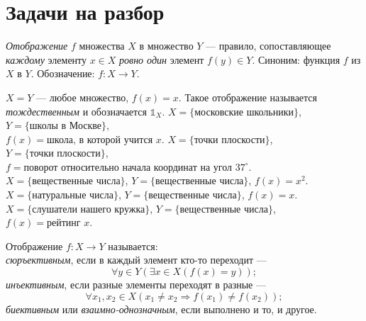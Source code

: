 \documentclass[a4paper,12pt]{article}
\begin{document}
    
    \section{Задачи на разбор}
    
     \emph{Отображение} $f$ множества $X$ в множество $Y$ --- правило, сопоставляющее \textit{каждому} элементу $x \in X$ \textit{ровно один} элемент $f(y) \in Y$. Синоним: функция $f$ из $X$ в $Y$. Обозначение: $f \colon X \to Y$.
    
    \example %
    $X = Y$ --- любое множество, $f(x) = x$. Такое отображение называется \emph{тождественным} и обозначается $\mathds{1}_X$.
    \example \label{pupil_school} %
    $X = \{\text{московские школьники}\}$, $Y = \{\text{школы в Москве}\}$, \\
    $f(x) = \text{школа, в которой учится } x$.
    \example %
    $X = \{\text{точки плоскости}\}$, $Y = \{\text{точки плоскости}\}$, \\
    $f = \text{поворот относительно начала координат на угол }37^\circ$.
    \example %
    $X = \{\text{вещественные числа}\}$, $Y = \{\text{вещественные числа}\}$, $f(x) = x^2$.
    \example \label{natural_to_real_inclusion} %
    $X = \{\text{натуральные числа}\}$, $Y = \{\text{вещественные числа}\}$, $f(x) = x$.
    \example %
    $X = \{\text{слушатели нашего кружка}\}$, $Y = \{\text{вещественные числа}\}$, \\
    $f(x) = \text{рейтинг } x$.
    
     Отображение $f \colon X \to Y$ называется:\\
    \emph{сюръективным}, если в каждый элемент кто-то переходит --- 
    \begin{equation*}
        \forall y \in Y (\exists x \in X (f(x) = y));
    \end{equation*}
    \emph{инъективным}, если разные элементы переходят в разные --- 
    \begin{equation*}
        \forall x_1, x_2 \in X (x_1 \neq x_2 \Rightarrow f(x_1) \neq f(x_2));
    \end{equation*}
    \emph{биективным} или \emph{взаимно-однозначным}, если выполнено и то, и другое.
    
\end{document}
